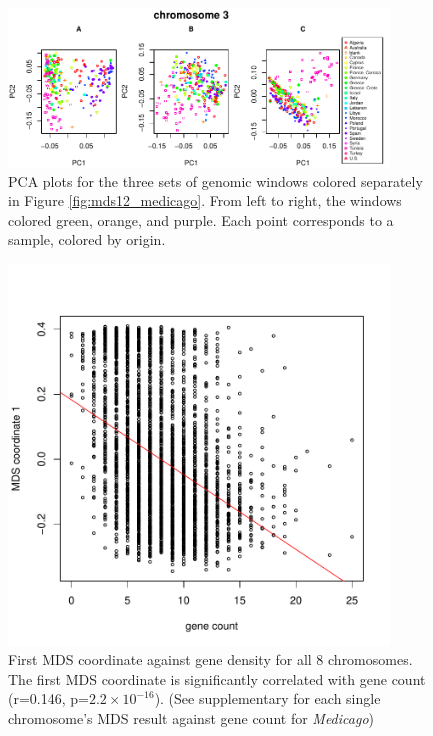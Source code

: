 \documentclass[11pt, oneside]{article}   	%
\begin{document}
\begin{figure}
    \begin{center}
       \includegraphics[width=0.9\textwidth]{Fig7_pca_plots_for_Medicago_chr3_3peaks_byMDS}
    \end{center}
    \caption{
        PCA plots for the three sets of genomic windows colored separately in Figure \ref{fig:mds12_medicago}. 
        From left to right, the windows colored green, orange, and purple. Each point corresponds to a sample, colored by origin.
        \label{fig:pca_medicago}
    }
\end{figure}


\begin{figure}
    \begin{center}
       \includegraphics[width=0.9\textwidth]{MDS_1D_against_gene_count_all_chr_win104_with_lm}
    \end{center}
    \caption{
        First MDS coordinate against gene density for all 8 chromosomes. 
        The first MDS coordinate is significantly correlated with gene count (r=0.146, p=$2.2\times 10^{-16}$). 
        (See supplementary for each single chromosome's MDS result against gene count for \textit{Medicago})
        \label{fig:mds_gene_count}
    }
\end{figure}
\end{document}
